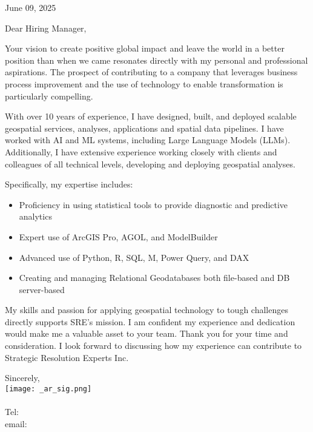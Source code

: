 \documentclass[letterpaper]{article}
\newenvironment{itemlist}
        {
            \vspace{-12pt}
            \begin{itemize} \itemsep 0pt
        }{
            \end{itemize}
            \vspace{-3pt}
        }
\newenvironment{itemlist}
        {
            \vspace{-12pt}
            \begin{itemize} \itemsep 0pt
        }{
            \end{itemize}
            \vspace{-3pt}
        }
\begin{document}
\large

\null\hfill June 09, 2025

Dear Hiring Manager,

Your vision to create positive global impact and leave the world in a better position than when we came
resonates directly with my personal and professional aspirations.
The prospect of contributing to a company that leverages
business process improvement and the use of technology to enable transformation 
is particularly compelling.

With over 10 years of experience, I have designed, built, and deployed scalable
geospatial services, analyses, applications and spatial data pipelines.
I have worked with AI and ML systems, including Large Language Models (LLMs).
Additionally, I have extensive experience working closely with clients and colleagues
of all technical levels, developing and deploying geospatial analyses.

Specifically, my expertise includes:  
\begin{itemlist}
\item Proficiency in using statistical tools to provide diagnostic and predictive analytics
\item Expert use of ArcGIS Pro, AGOL, and ModelBuilder
\item Advanced use of Python, R, SQL, M, Power Query, and DAX
\item Creating and managing Relational Geodatabases both file-based and DB server-based
\end{itemlist}

My skills and passion for applying geospatial technology to tough
challenges directly supports SRE’s mission. 
I am confident my experience and dedication would make me a valuable asset to your team. 
Thank you for your time and consideration. 
I look forward to discussing how my experience can contribute to Strategic Resolution Experts Inc.

Sincerely,\\
    \hspace{1em}
    \texttt{[image: \_ar\_sig.png]} \\
    \CVsigname \\
    \small
    Tel: \CVphone \\
    email: \CVemail
\end{document}
